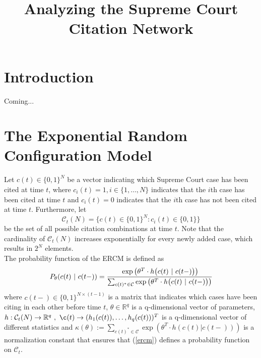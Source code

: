 \documentclass[headsepline=true, abstracton]{scrartcl}
\begin{document}
\setcounter{section}{-1}

\renewcommand{\refname}{Bibliography}


\onehalfspacing
\setlength{\headsep}{15mm}


\thispagestyle{plain}

\title{\Large Analyzing the Supreme Court Citation Network}
\maketitle

\begin{abstract}
\noindent 
\end{abstract}


 \section*{Introduction}
 
 Coming...
 
 \section*{The Exponential Random Configuration Model}
Let $c(t)\in \{0,1\}^N$ be a vector indicating which Supreme Court case has been cited at time $t$, where $c_i(t)=1, i \in \{1, \dots , N\}$ indicates that the $i$th case has been cited at time $t$ and $c_i(t)=0$ indicates that the $i$th case has not been cited at time $t$. Furthermore, let
$$\mathcal{C}_t(N)=\{c(t)\in \{0,1\}^N: c_i(t)\in \{0,1\} \}$$ 
be the set of all possible citation combinations at time $t$. Note that the cardinality of $\mathcal{C}_t(N)$ increases exponentially for every newly added case, which results in $2^N$ elements.\\
The probability function of the ERCM is defined as
\begin{equation}
P_{\theta}(c(t)~|~c(t-))=\cfrac{\exp\big(\theta^T\cdot h\big(c(t)~|~c(t-)\big)\big)}{\sum_{c(t)^*\in \mathcal{C}}\exp\big(\theta^T\cdot h\big(c(t)~|~c(t-)\big)\big)}
\label{ercm}
\end{equation}
where $c(t-)\in \{0,1\}^{N \times (t-1)}$ is a matrix that indicates which cases have been citing in each other before time $t$, $\theta \in \mathbb{R}^q$ is a q-dimensional vector of parameters,  $h: \mathcal{C}_t(N) \to \mathbb{R}^q ~, ~ \c(t) \to (h_1(c(t)), \dots , h_q(c(t)))^T$ is a q-dimensional vector of different statistics and $\kappa(\theta) := \sum_{c(t)^*\in \mathcal{C}}\exp(\theta^T\cdot h(c(t)|c(t-)))$ is a normalization constant that ensures that (\ref{ercm}) defines a probability function on $\mathcal{C}_t$.\\[0.3cm]
\end{document}
